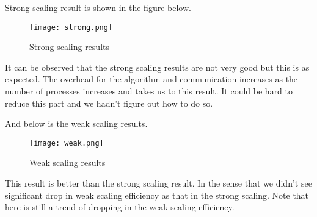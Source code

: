 Strong scaling result is shown in the figure below.

\begin{figure}[htp]
\centering
\texttt{[image: strong.png]}
\caption{Strong scaling results}
\end{figure}

It can be observed that the strong scaling results are not very good but this is as expected. The overhead for the algorithm and communication increases as the number of processes increases and takes us to this result. It could be hard to reduce this part and we hadn't figure out how to do so.

And below is the weak scaling results.

\begin{figure}[htp]
\centering
\texttt{[image: weak.png]}
\caption{Weak scaling results}
\end{figure}

This result is better than the strong scaling result. In the sense that we didn't see significant drop in weak scaling efficiency as that in the strong scaling. Note that here is still a trend of dropping in the weak scaling efficiency.